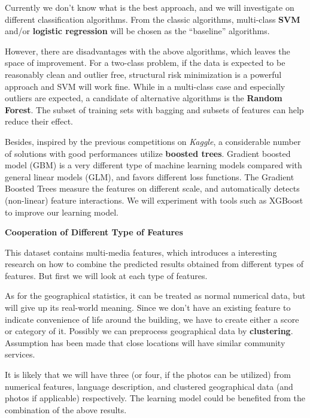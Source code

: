 \documentclass{article}
\begin{document}
Currently we don't know what is the best approach, and we will investigate on different classification algorithms. From the classic algorithms, multi-class \textbf{SVM} and/or \textbf{logistic regression} will be chosen as the ``baseline'' algorithms.

However, there are disadvantages with the above algorithms, which leaves the space of improvement. For a two-class problem, if the data is expected to be reasonably clean and outlier free, structural risk minimization is a powerful approach and SVM will work fine. While in a multi-class case and especially outliers are expected, a candidate of alternative algorithms is the \textbf{Random Forest}. The subset of training sets with bagging and subsets of features can help reduce their effect. 

Besides, inspired by the previous competitions on \textit{Kaggle}, a considerable number of solutions with good performances utilize \textbf{boosted trees}. Gradient boosted model (GBM) is a very different type of machine learning models compared with general linear models (GLM), and favors different loss functions. The Gradient Boosted Trees measure the features on different scale, and automatically detects (non-linear) feature interactions. We will experiment with tools such as XGBoost to improve our learning model. 
\vspace{1.0em}

\noindent\textbf{\large Cooperation of Different Type of Features} 

This dataset contains multi-media features, which introduces a interesting research on how to combine the predicted results obtained from different types of features. But first we will look at each type of features.

As for the geographical statistics, it can be treated as normal numerical data, but will give up its real-world meaning. Since we don't have an existing feature to indicate convenience of life around the building, we have to create either a score or category of it. Possibly we can preprocess geographical data by \textbf{clustering}. Assumption has been made that close locations will have similar community services.

It is likely that we will have three (or four, if the photos can be utilized) from numerical features, language description, and clustered geographical data (and photos if applicable) respectively. The learning model could be benefited from the combination of the above results. 

\vspace{1.0em}
\end{document}
